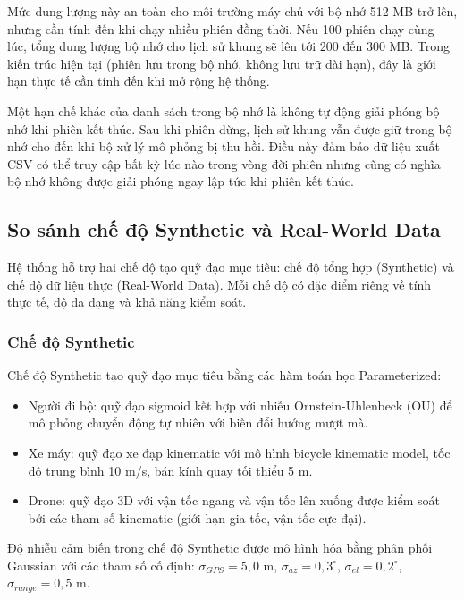 Mức dung lượng này an toàn cho môi trường máy chủ với bộ nhớ 512 MB trở lên, nhưng cần tính đến khi chạy nhiều phiên đồng thời. Nếu 100 phiên chạy cùng lúc, tổng dung lượng bộ nhớ cho lịch sử khung sẽ lên tới 200 đến 300 MB. Trong kiến trúc hiện tại (phiên lưu trong bộ nhớ, không lưu trữ dài hạn), đây là giới hạn thực tế cần tính đến khi mở rộng hệ thống.

Một hạn chế khác của danh sách trong bộ nhớ là không tự động giải phóng bộ nhớ khi phiên kết thúc. Sau khi phiên dừng, lịch sử khung vẫn được giữ trong bộ nhớ cho đến khi bộ xử lý mô phỏng bị thu hồi. Điều này đảm bảo dữ liệu xuất CSV có thể truy cập bất kỳ lúc nào trong vòng đời phiên nhưng cũng có nghĩa bộ nhớ không được giải phóng ngay lập tức khi phiên kết thúc.

\subsection{So sánh chế độ Synthetic và Real-World Data}

\hspace{0.5cm} Hệ thống hỗ trợ hai chế độ tạo quỹ đạo mục tiêu: chế độ tổng hợp (Synthetic) và chế độ dữ liệu thực (Real-World Data). Mỗi chế độ có đặc điểm riêng về tính thực tế, độ đa dạng và khả năng kiểm soát.

\subsubsection{Chế độ Synthetic}

\hspace{0.5cm} Chế độ Synthetic tạo quỹ đạo mục tiêu bằng các hàm toán học Parameterized:
\begin{itemize}
\item Người đi bộ: quỹ đạo sigmoid kết hợp với nhiễu Ornstein-Uhlenbeck (OU) để mô phỏng chuyển động tự nhiên với biến đổi hướng mượt mà.
\item Xe máy: quỹ đạo xe đạp kinematic với mô hình bicycle kinematic model, tốc độ trung bình 10 m/s, bán kính quay tối thiểu 5 m.
\item Drone: quỹ đạo 3D với vận tốc ngang và vận tốc lên xuống được kiểm soát bởi các tham số kinematic (giới hạn gia tốc, vận tốc cực đại).
\end{itemize}

Độ nhiễu cảm biến trong chế độ Synthetic được mô hình hóa bằng phân phối Gaussian với các tham số cố định: $\sigma_{GPS} = 5{,}0$ m, $\sigma_{az} = 0{,}3^{\circ}$, $\sigma_{el} = 0{,}2^{\circ}$, $\sigma_{range} = 0{,}5$ m.

